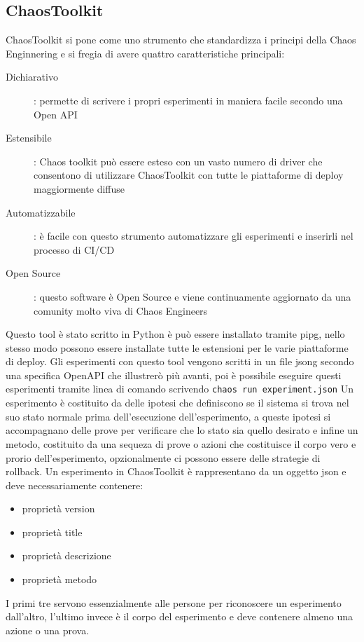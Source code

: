 \subsection{ChaosToolkit}
ChaosToolkit si pone come uno strumento che standardizza i principi della Chaos Enginnering e si fregia di avere quattro caratteristiche principali:
\begin{description}
    \item[Dichiarativo]: permette di scrivere i propri esperimenti in maniera facile secondo una Open API
    \item[Estensibile]: Chaos toolkit può essere esteso con un vasto numero di driver che consentono di utilizzare ChaosToolkit con tutte le piattaforme di deploy maggiormente diffuse
    \item[Automatizzabile]: è facile con questo strumento automatizzare gli esperimenti e inserirli nel processo di CI/CD
    \item[Open Source]: questo software è Open Source e viene continuamente aggiornato da una comunity molto viva di Chaos Engineers
\end{description}
Questo tool è stato scritto in Python è può essere installato tramite \gls{pipg}, nello stesso modo possono essere installate tutte le estensioni per le varie piattaforme di deploy.
Gli esperimenti con questo tool vengono scritti in un file \gls{jsong} secondo una specifica OpenAPI che illustrerò più avanti, poi è possibile eseguire questi esperimenti tramite linea di comando scrivendo
\texttt{chaos run experiment.json}
Un esperimento è costituito da delle ipotesi che definiscono se il sistema si trova nel suo stato normale prima dell'esecuzione dell'esperimento, a queste ipotesi si accompagnano delle prove per verificare che lo stato sia quello desirato e infine un metodo, costituito da una sequeza di prove o azioni che costituisce il corpo vero e prorio dell'esperimento, opzionalmente ci possono essere delle strategie di rollback.
Un esperimento in ChaosToolkit è rappresentano da un oggetto json e deve necessariamente contenere:
\begin{itemize}
    \item proprietà version
    \item proprietà title
    \item proprietà descrizione
    \item proprietà metodo
\end{itemize}
I primi tre servono essenzialmente alle persone per riconoscere un esperimento dall'altro, l'ultimo invece è il corpo del esperimento e deve contenere almeno una azione o una prova.
